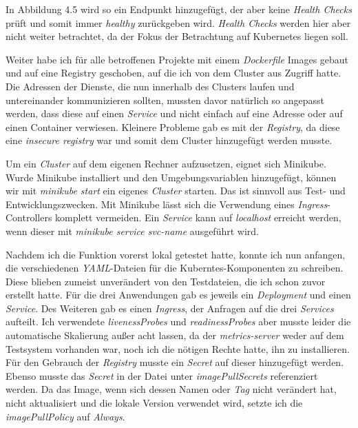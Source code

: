 \documentclass[12pt,a4paper]{scrartcl}
\begin{document}
In Abbildung 4.5 wird so ein Endpunkt hinzugefügt, der aber keine \emph{Health Checks}\cite{hthChk} prüft und somit immer \emph{healthy} zurückgeben wird. \emph{Health Checks} werden hier aber nicht weiter betrachtet, da der Fokus der Betrachtung auf Kubernetes liegen soll.

Weiter habe ich für alle betroffenen Projekte mit einem \emph{Dockerfile} Images gebaut und auf eine Registry geschoben, auf die ich von dem Cluster aus Zugriff hatte. Die Adressen der Dienste, die nun innerhalb des Clusters laufen und untereinander kommunizieren sollten, mussten davor natürlich so angepasst werden, dass diese auf einen \emph{Service} und nicht einfach auf eine Adresse oder auf einen Container verwiesen. Kleinere Probleme gab es mit der \emph{Registry}, da diese eine \emph{insecure registry} war und somit dem Cluster hinzugefügt werden musste.

Um ein \emph{Cluster} auf dem eigenen Rechner aufzusetzen, eignet sich Minikube. Wurde Minikube installiert und den Umgebungsvariablen hinzugefügt, können wir mit \emph{minikube start} ein eigenes \emph{Cluster} starten. Das ist sinnvoll aus Test- und Entwicklungszwecken. Mit Minikube lässt sich die Verwendung eines \emph{Ingress}-Controllers komplett vermeiden. Ein \emph{Service} kann auf \emph{localhost} erreicht werden, wenn dieser mit \emph{minikube service svc-name} ausgeführt wird. 

Nachdem ich die Funktion vorerst lokal getestet hatte, konnte ich nun anfangen, die verschiedenen \emph{YAML}-Dateien für die Kuberntes-Komponenten zu schreiben. Diese blieben zumeist unverändert von den Testdateien, die ich schon zuvor erstellt hatte. Für die drei Anwendungen gab es jeweils ein \emph{Deployment} und einen \emph{Service}. Des Weiteren gab es einen \emph{Ingress}, der Anfragen auf die drei \emph{Services} aufteilt. Ich verwendete \emph{livenessProbes} und \emph{readinessProbes} aber musste leider die automatische Skalierung außer acht lassen, da der \emph{metrics-server} weder auf dem Testsystem vorhanden war, noch ich die nötigen Rechte hatte, ihn zu installieren. Für den Gebrauch der \emph{Registry} musste ein \emph{Secret} auf dieser hinzugefügt werden. Ebenso musste das \emph{Secret} in der Datei unter \emph{imagePullSecrets} referenziert werden. Da das Image, wenn sich dessen Namen oder \emph{Tag} nicht verändert hat, nicht aktualisiert und die lokale Version verwendet wird, setzte ich die \emph{imagePullPolicy} auf \emph{Always}.
\end{document}
